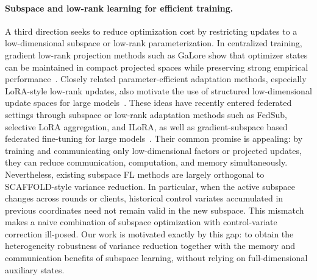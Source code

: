 \paragraph{Subspace and low-rank learning for efficient training.}
A third direction seeks to reduce optimization cost by restricting updates to a low-dimensional subspace or low-rank parameterization. In centralized training, gradient low-rank projection methods such as GaLore show that optimizer states can be maintained in compact projected spaces while preserving strong empirical performance~\cite{zhao2024galore,su2025galore2,zhang2024qgalore,hao2024flora,pan2025unbiased}. Closely related parameter-efficient adaptation methods, especially LoRA-style low-rank updates, also motivate the use of structured low-dimensional update spaces for large models~\cite{hu2022lora,xia2024chainlora,wang2023multilora,renduchintala2023tiedlora}. These ideas have recently entered federated settings through subspace or low-rank adaptation methods such as FedSub, selective LoRA aggregation, and ILoRA, as well as gradient-subspace based federated fine-tuning for large models~\cite{zhang2025fedsub,guo2024selective,zhou2025ilora,mahla2024exploring}. Their common promise is appealing: by training and communicating only low-dimensional factors or projected updates, they can reduce communication, computation, and memory simultaneously. Nevertheless, existing subspace FL methods are largely orthogonal to SCAFFOLD-style variance reduction. In particular, when the active subspace changes across rounds or clients, historical control variates accumulated in previous coordinates need not remain valid in the new subspace. This mismatch makes a naive combination of subspace optimization with control-variate correction ill-posed. Our work is motivated exactly by this gap: to obtain the heterogeneity robustness of variance reduction together with the memory and communication benefits of subspace learning, without relying on full-dimensional auxiliary states.
